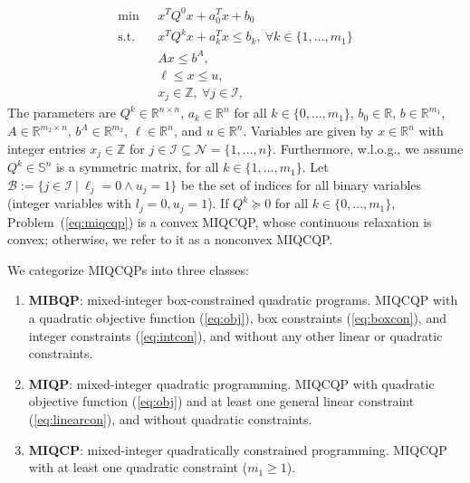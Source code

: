 \documentclass[]{article}
\begin{document}
\begin{subequations}\label{eq:miqcqp}
    \begin{align}
        \min\ &x^TQ^0x + a_0^Tx + b_0\label{eq:obj} \\
        \mbox{s.t.}\quad &x^TQ^kx + a_k^Tx \leq b_k,\ \forall k\in\{1,...,m_1\}\label{eq:quadcon}\\
        &Ax \leq b^{A},\label{eq:linearcon}\\
        &\ell \leq x \leq u,\label{eq:boxcon}\\
        &x_j\in \mathbb{Z},\ \forall j\in\mathcal{I}, \label{eq:intcon}
    \end{align}
\end{subequations}
The parameters are $Q^k \in \mathbb{R}^{n\times n}$, $a_k\in \mathbb{R}^n$ for all $k\in\{0,...,m_1\}$, $b_0\in \mathbb{R}$, $b\in \mathbb{R}^{m_1}$, $A\in \mathbb{R}^{m_2\times n}$, $b^A\in \mathbb{R}^{m_2}$, $\ell \in \mathbb{R}^n$, and $u \in \mathbb{R}^n$. Variables are given by $x\in \mathbb{R}^n$ with  integer entries $x_j\in \mathbb{Z}$ for $j\in \mathcal{I} \subseteq \mathcal{N} = \{1,...,n\}$. Furthermore, w.l.o.g., we assume $Q^k\in \mathbb{S}^n$ is a symmetric matrix, for all $k\in\{1,...,m_1\}$. Let $\mathcal{B} := \{j\in \mathcal{I}\ |\ \ell_j = 0 \wedge u_j= 1\}$ be the set of indices for all binary variables (integer variables with $l_j=0, u_j=1$). If $Q^k\succeq 0$ for all $k\in\{0,...,m_1\}$, Problem~(\ref{eq:miqcqp}) is a convex MIQCQP, whose continuous relaxation is convex; otherwise, we refer to it as a nonconvex MIQCQP.

We categorize MIQCQPs into three classes:

\begin{enumerate}
    \item \textbf{MIBQP}: mixed-integer box-constrained quadratic programs. MIQCQP with a quadratic objective function (\ref{eq:obj}), box constraints (\ref{eq:boxcon}), and integer constraints (\ref{eq:intcon}), and without any other linear or quadratic constraints.
    \item \textbf{MIQP}: mixed-integer quadratic programming. MIQCQP with quadratic objective function (\ref{eq:obj}) and at least one general linear constraint (\ref{eq:linearcon}), and without quadratic constraints. 
    \item \textbf{MIQCP}: mixed-integer quadratically constrained programming. MIQCQP with at least one quadratic constraint ($m_1 \geq 1$).
\end{enumerate}
\end{document}
